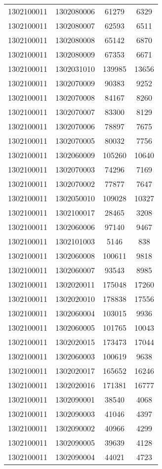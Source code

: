 \begin{longtable}{llcc}
1302100011 & 1302080006 & 61279 & 6329\\
1302100011 & 1302080007 & 62593 & 6511\\
1302100011 & 1302080008 & 65142 & 6870\\
1302100011 & 1302080009 & 67353 & 6671\\
1302100011 & 1302031010 & 139985 & 13656\\
1302100011 & 1302070009 & 90383 & 9252\\
1302100011 & 1302070008 & 84167 & 8260\\
1302100011 & 1302070007 & 83300 & 8129\\
1302100011 & 1302070006 & 78897 & 7675\\
1302100011 & 1302070005 & 80032 & 7756\\
1302100011 & 1302060009 & 105260 & 10640\\
1302100011 & 1302070003 & 74296 & 7169\\
1302100011 & 1302070002 & 77877 & 7647\\
1302100011 & 1302050010 & 109028 & 10327\\
1302100011 & 1302100017 & 28465 & 3208\\
1302100011 & 1302060006 & 97140 & 9467\\
1302100011 & 1302101003 & 5146 & 838\\
1302100011 & 1302060008 & 100611 & 9818\\
1302100011 & 1302060007 & 93543 & 8985\\
1302100011 & 1302020011 & 175048 & 17260\\
1302100011 & 1302020010 & 178838 & 17556\\
1302100011 & 1302060004 & 103015 & 9936\\
1302100011 & 1302060005 & 101765 & 10043\\
1302100011 & 1302020015 & 173473 & 17044\\
1302100011 & 1302060003 & 100619 & 9638\\
1302100011 & 1302020017 & 165652 & 16246\\
1302100011 & 1302020016 & 171381 & 16777\\
1302100011 & 1302090001 & 38540 & 4068\\
1302100011 & 1302090003 & 41046 & 4397\\
1302100011 & 1302090002 & 40966 & 4299\\
1302100011 & 1302090005 & 39639 & 4128\\
1302100011 & 1302090004 & 44021 & 4723\\

\end{longtable}
